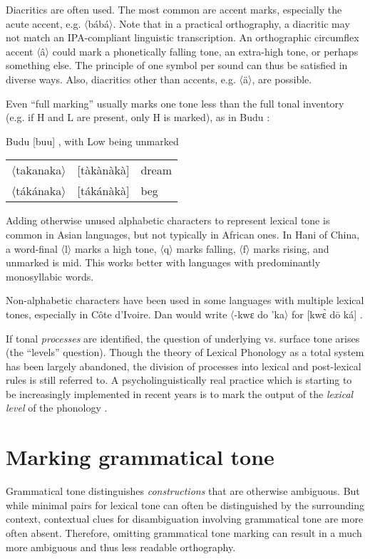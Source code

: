 \documentclass[output=paper]{langscibook}
\begin{document}
Diacritics are often used. The most common are accent marks, especially the acute accent, e.g. 〈bábá〉. Note that in a practical orthography, a diacritic may not match an IPA-compliant linguistic transcription. An orthographic circumflex accent 〈â〉 could mark a phonetically falling tone, an extra-high tone, or perhaps something else. The principle of one symbol per sound can thus be satisfied in diverse ways. Also, diacritics other than accents, e.g. 〈ä〉, are possible.

Even “full marking” usually marks one tone less than the full tonal inventory (e.g. if H and L are present, only H is marked), as in Budu \citep{Roberts2013}: 

\ea 
Budu [buu] \citep{Roberts2013}, with Low being unmarked

\begin{tabular}{@{}lll@{}}
〈takanaka〉    &  [tàkànàkà]         & dream\\
〈tákánaka〉  & [tákánàkà]&         beg\\
\end{tabular}
\z

Adding otherwise unused alphabetic characters to represent lexical tone is common in Asian languages, but not typically in African ones. In Hani of China, a word-final 〈l〉 marks a high tone, 〈q〉 marks falling, 〈f〉 marks rising, and unmarked is mid. This works better with languages with predominantly monosyllabic words. 

Non-alphabetic characters have been used in some languages with multiple lexical tones, especially in Côte d’Ivoire. Dan would write  〈-kwɛ do 'ka〉 for  [kwɛ̀ dō ká] \citep{Bolli1978}.

If tonal \textit{processes} are identified, the question of underlying vs. surface tone arises (the “levels” question). Though the theory of Lexical Phonology as a total system has been largely abandoned, the division of processes into lexical and post-lexical rules is still referred to. A psycholinguistically real practice which is starting to be increasingly implemented in recent years is to mark the output of the \textit{lexical level} of the phonology \citep{Snider2014,Roberts2013, Roberts2016}.

\section{Marking grammatical tone}\label{sec:cahill:3}
Grammatical tone distinguishes \textit{constructions} that are otherwise ambiguous. But while minimal pairs for lexical tone can often be distinguished by the surrounding context, contextual clues for disambiguation involving grammatical tone are more often absent. Therefore, omitting grammatical tone marking can result in a much more ambiguous and thus less readable orthography. 
\end{document}
